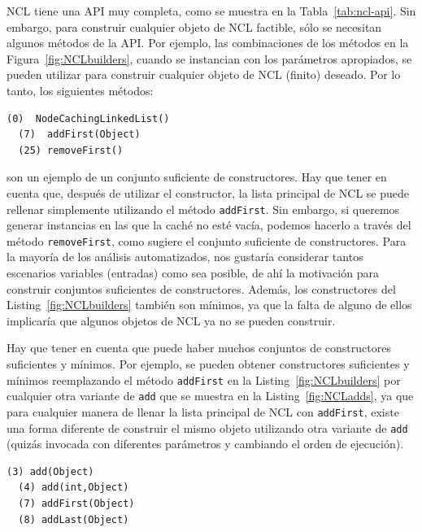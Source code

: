 NCL tiene una API muy completa, como se muestra en la Tabla~\ref{tab:ncl-api}. Sin embargo, para construir cualquier objeto de NCL factible, sólo se necesitan algunos métodos de la API. Por ejemplo, las combinaciones de los métodos en la Figura~\ref{fig:NCLbuilders}, cuando se instancian con los parámetros apropiados, se pueden utilizar para construir cualquier objeto de NCL (finito) deseado. Por lo tanto, los siguientes métodos:
\\
\begin{lstlisting}[label=fig:NCLbuilders, caption=Conjunto de metodos sufiente para NCL]
  (0)  NodeCachingLinkedList()
  (7)  addFirst(Object)
  (25) removeFirst()
\end{lstlisting}


 son un ejemplo de un conjunto suficiente de constructores. Hay que tener en cuenta que, después de utilizar el constructor, la lista principal de NCL se puede rellenar simplemente utilizando el método \texttt{addFirst}. Sin embargo, si queremos generar instancias en las que la caché no esté vacía, podemos hacerlo a través del método \texttt{removeFirst}, como sugiere el conjunto suficiente de constructores. Para la mayoría de los análisis automatizados, nos gustaría considerar tantos escenarios variables (entradas) como sea posible, de ahí la motivación para construir conjuntos suficientes de constructores. Además, los constructores del Listing~\ref{fig:NCLbuilders} también son mínimos, ya que la falta de alguno de ellos implicaría que algunos objetos de NCL ya no se pueden construir.

Hay que tener en cuenta que puede haber muchos conjuntos de constructores suficientes y mínimos. Por ejemplo, se pueden obtener constructores suficientes y mínimos reemplazando el método \texttt{addFirst} en la Listing~\ref{fig:NCLbuilders} por cualquier otra variante de \texttt{add} que se muestra en la Listing~\ref{fig:NCLadds}, ya que para cualquier manera de llenar la lista principal de NCL con \texttt{addFirst}, existe una forma diferente de construir el mismo objeto utilizando otra variante de \texttt{add} (quizás invocada con diferentes parámetros y cambiando el orden de ejecución).
\\
\begin{lstlisting}[label=fig:NCLadds, caption=Variantes del método 'Add' que puedo ser utilizado para rellanar la lista principal en NCL, captionpos=b, frame=tb , basicstyle=\scriptsize]
  (3) add(Object)
  (4) add(int,Object)
  (7) addFirst(Object)
  (8) addLast(Object)
\end{lstlisting}


